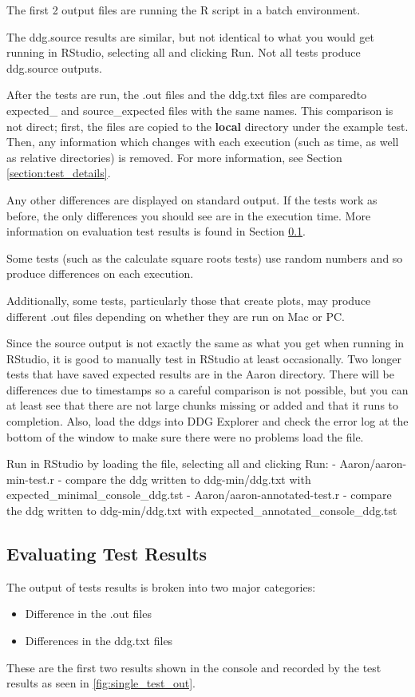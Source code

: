 \documentclass[12pt]{article}
\begin{document}
The first 2 output files are running the R script in a batch environment.

The ddg.source results are similar, but not identical to what you would get running in RStudio, selecting all and clicking Run.  Not all tests produce ddg.source outputs.

After the tests are run, the .out files and the ddg.txt files are comparedto expected\_ and source\_expected files with the same names. This comparison is not direct; first, the files are copied to the \textbf{local} directory under the example test. Then, any information which changes with each execution (such as time, as well as relative directories) is removed. For more information, see Section \ref{section:test_details}.

Any other  differences are displayed on standard output.  If the tests work as before, the only  differences you should see are in the execution time. More information on evaluation test results is found in Section \ref{section:evaluate_results}.

Some tests (such as the calculate square roots tests) use random numbers and so produce differences on each execution.  

Additionally, some tests, particularly those that create plots, may produce different 
.out files depending on whether they are run on Mac or PC.

Since the source output is not exactly the same as what you get when running in 
RStudio, it is good to manually test in RStudio at least occasionally.  Two longer
tests that have saved expected results are in the Aaron directory.  There will be
differences due to timestamps so a careful comparison is not possible, but you can at 
least see that there are not large chunks missing or added and that it runs
to completion.  Also, load the ddgs into DDG Explorer and check the error log
at the bottom of the window to make sure there were no problems load the file.  
  
Run in RStudio by loading the file, selecting all and clicking Run:
- Aaron/aaron-min-test.r - compare the ddg written to ddg-min/ddg.txt 
  with expected\_minimal\_console\_ddg.tst
- Aaron/aaron-annotated-test.r - compare the ddg written to ddg-min/ddg.txt 
  with expected\_annotated\_console\_ddg.tst

\subsection{Evaluating Test Results}
\label{section:evaluate_results}
The output of tests results is broken into two major categories:
\begin{itemize}
\item Difference in the .out files
\item Differences in the ddg.txt files
\end{itemize}
These are the first two results shown in the console and recorded by the test results as seen in \ref{fig:single_test_out}. 
\end{document}
